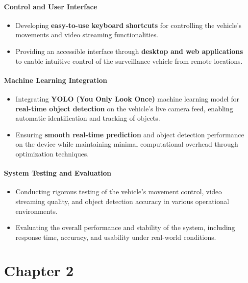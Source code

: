 \documentclass[12pt,a4paper]{report}
\begin{document}
\subsubsection*{Control and User Interface}
\begin{itemize}
    \item Developing \textbf{easy-to-use keyboard shortcuts} for controlling the vehicle’s movements and video streaming functionalities.
    \item Providing an accessible interface through \textbf{desktop and web applications} to enable intuitive control of the surveillance vehicle from remote locations.
\end{itemize}

\subsubsection*{Machine Learning Integration}
\begin{itemize}
    \item Integrating \textbf{YOLO (You Only Look Once)} machine learning model for \textbf{real-time object detection} on the vehicle's live camera feed, enabling automatic identification and tracking of objects.
    \item Ensuring \textbf{smooth real-time prediction} and object detection performance on the device while maintaining minimal computational overhead through optimization techniques.
\end{itemize}

\subsubsection*{System Testing and Evaluation}
\begin{itemize}
    \item Conducting rigorous testing of the vehicle’s movement control, video streaming quality, and object detection accuracy in various operational environments.
    \item Evaluating the overall performance and stability of the system, including response time, accuracy, and usability under real-world conditions.
\end{itemize}




	{\vfill \chapter*{\centering \vfill Chapter 2 \vfill}\vfill}
	\thispagestyle{empty}
	\newpage
	\label{Tools and Techniques Used}
\end{document}
